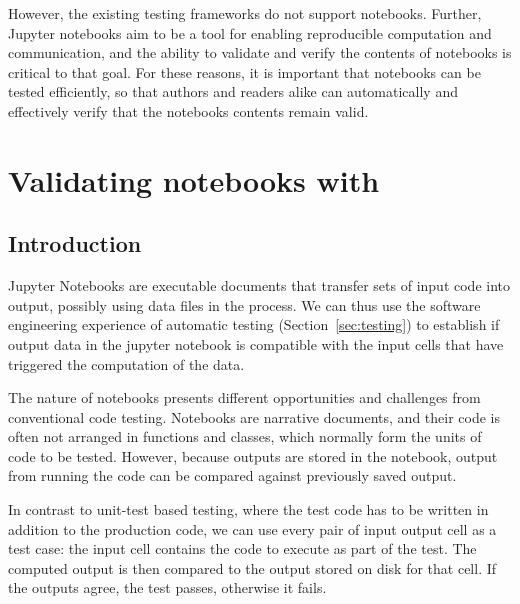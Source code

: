 \documentclass{deliverablereport}
\begin{document}



However, the existing testing frameworks do not support notebooks.
Further, Jupyter notebooks aim to be a tool for enabling reproducible
computation and communication, and the ability to validate and verify
the contents of notebooks is critical to that goal.  For these
reasons, it is important that notebooks can be tested efficiently, so
that authors and readers alike can automatically and effectively
verify that the notebooks contents remain valid.

%
%
%
%
%
%

\section{Validating notebooks with \nbval} %

\subsection{Introduction}

Jupyter Notebooks are executable documents that transfer sets of input
code into output, possibly using data files in the process. We can
thus use the software engineering experience of automatic testing
(Section~\ref{sec:testing}) to establish if output data in the jupyter
notebook is compatible with the input cells that have triggered the
computation of the data.

The nature of notebooks presents different opportunities and
challenges from conventional code testing.  Notebooks are narrative
documents, and their code is often not arranged in functions and
classes, which normally form the units of code to be tested.  However,
because outputs are stored in the notebook, output from running the
code can be compared against previously saved output.

In contrast to unit-test based testing, where the test code has to be
written in addition to the production code, we can use every pair of
input output cell as a test case: the input cell contains the code to
execute as part of the test. The computed output is then compared to
the output stored on disk for that cell. If the outputs agree, the
test passes, otherwise it fails.
\end{document}
